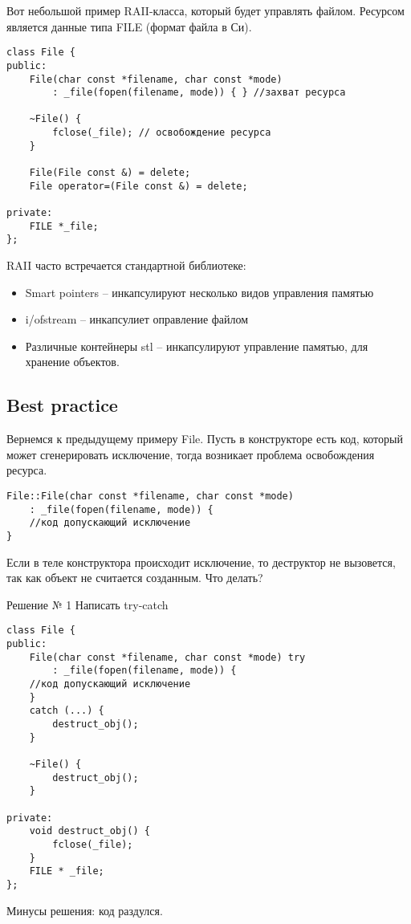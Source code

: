 Вот небольшой пример RAII-класса, который будет управлять файлом.
Ресурсом является данные типа FILE (формат файла в Си).
\begin{verbatim}
class File {
public:
    File(char const *filename, char const *mode)
        : _file(fopen(filename, mode)) { } //захват ресурса

    ~File() {
        fclose(_file); // освобождение ресурса
    }

    File(File const &) = delete;
    File operator=(File const &) = delete;

private:
    FILE *_file;
};
\end{verbatim}

RAII часто встречается стандартной библиотеке:
\begin{itemize}
\item Smart pointers -- инкапсулируют несколько видов управления памятью
\item i/ofstream -- инкапсулиет оправление файлом
\item Различные контейнеры stl -- инкапсулируют управление памятью, для хранение объектов.
\end{itemize}

\subsection{Best practice}

Вернемся к предыдущему примеру File.
Пусть в конструкторе есть код, который может сгенерировать исключение, тогда возникает проблема освобождения ресурса.

\begin{verbatim}
File::File(char const *filename, char const *mode)
    : _file(fopen(filename, mode)) {
    //код допускающий исключение
}
\end{verbatim}
Если в теле конструктора происходит исключение, то деструктор не вызовется, так как объект не считается созданным. Что делать?

Решение № 1
Написать try-catch
\begin{verbatim}
class File {
public:
    File(char const *filename, char const *mode) try
        : _file(fopen(filename, mode)) {
    //код допускающий исключение
    }
    catch (...) {
        destruct_obj();
    }

    ~File() {
        destruct_obj();
    }

private:
    void destruct_obj() {
        fclose(_file);
    }
    FILE * _file;
};
\end{verbatim}
Минусы решения: код раздулся.

